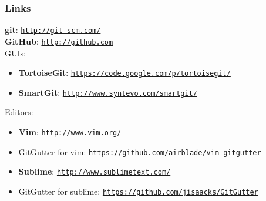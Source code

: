 \documentclass{beamer}
\begin{document}

\begin{frame}
    \frametitle{Links}
    \textbf{git}: \texttt{\url{http://git-scm.com/}}\\
    \textbf{GitHub}: \texttt{\url{http://github.com}}\\
    \medskip
    GUIs:
    \begin{itemize}
        \item \textbf{TortoiseGit}: \texttt{\url{https://code.google.com/p/tortoisegit/}}
        \item \textbf{SmartGit}: \texttt{\url{http://www.syntevo.com/smartgit/}}
    \end{itemize}
    \medskip
    Editors:
    \begin{itemize}
        \item \textbf{Vim}: \texttt{\url{http://www.vim.org/}}
        \item GitGutter for vim: \texttt{\url{https://github.com/airblade/vim-gitgutter}}
        \item \textbf{Sublime}: \texttt{\url{http://www.sublimetext.com/}}
        \item GitGutter for sublime: \texttt{\url{https://github.com/jisaacks/GitGutter}}
    \end{itemize}
\end{frame}


%
\end{document}

